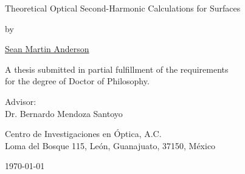 \begin{titlingpage*}

\let\cleardoublepage\clearpage

\begin{center}

\vspace*{2cm}

{\Huge Theoretical Optical Second-Harmonic Calculations for Surfaces}
\vspace{1.0cm}

{\large by}
\vspace{1.0cm}

{\LARGE \href{mailto:sean.martin.anderson@gmail.com}{Sean Martin Anderson}}
\vspace{3cm}

{\Large A thesis submitted in partial fulfillment of the requirements\\
\vspace{0.25cm}
for the degree of Doctor of Philosophy.}
\vspace{4cm}

{\large Advisor:\\
Dr. Bernardo Mendoza Santoyo
\vspace*{1cm}

Centro de Investigaciones en \'Optica, A.C.\\
Loma del Bosque 115, Le\'on, Guanajuato, 37150, M\'exico}

\vfill

\today

\end{center}

\end{titlingpage*}
